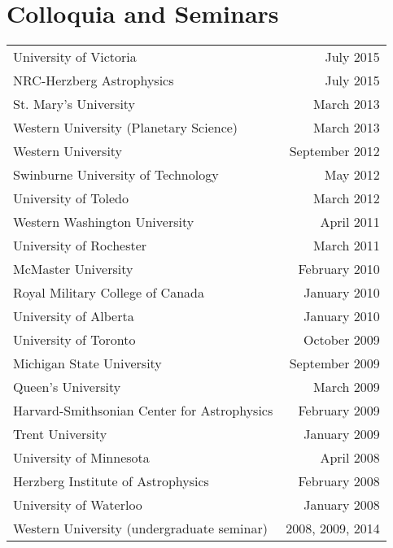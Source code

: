 \documentclass[12pt]{article}
\begin{document}
\section{Colloquia and Seminars}
\begin{tabularx}{\textwidth}{Xr}
University of Victoria& July 2015\\ %
NRC-Herzberg Astrophysics& July 2015\\ %
St. Mary's University& March 2013\\ %
Western University (Planetary Science)& March 2013\\ %
Western University& September 2012\\ %
Swinburne University of Technology& May 2012\\  %
University of Toledo& March 2012\\ %
Western Washington University& April 2011\\ %
University of Rochester& March 2011\\ %
McMaster University&  February 2010\\ %
Royal Military College of Canada& January 2010\\ %
University of Alberta& January 2010\\ %
University of Toronto&  October 2009\\%
Michigan State University& September 2009\\%
Queen's University& March 2009\\ %
Harvard-Smithsonian Center for Astrophysics& February 2009\\ %
Trent University& January 2009\\ %
University of Minnesota& April 2008\\ %
Herzberg Institute of Astrophysics& February 2008\\ %
University of Waterloo& January 2008\\ %
Western University (undergraduate seminar)& 2008, 2009, 2014\\

\end{tabularx}
\end{document}
